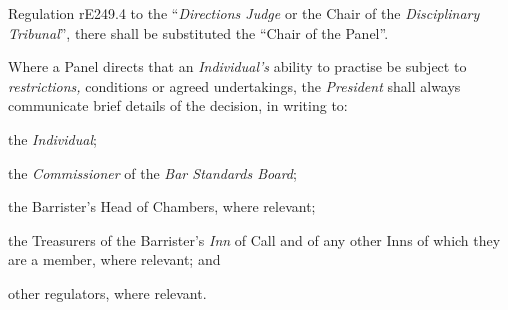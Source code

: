 Regulation rE249.4 to the ``\emph{Directions Judge} or the Chair of
the \emph{Disciplinary Tribunal}'', there shall be substituted the
``Chair of the Panel''.\\
\par
Where a Panel directs that an \emph{Individual's} ability to practise be
subject to \emph{restrictions,} conditions or agreed undertakings,
the \emph{President} shall always communicate brief details of the
decision, in writing to:\\\nl \item the \emph{Individual};\item the \emph{Commissioner} of the \emph{Bar Standards Board};\item  the Barrister's Head of Chambers, where relevant;\item  the Treasurers of the Barrister's \emph{Inn} of Call and of any
other Inns of which they are a member, where relevant; and\item  other regulators, where relevant.\ln
{}

